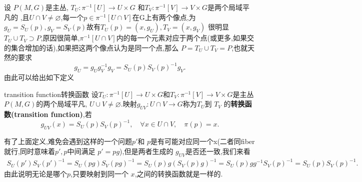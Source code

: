 \documentclass[../main.tex]{subfiles}
\begin{document}
 设 $P(M,G)$是主丛, $T_U : \pi^{-1} [U] \to  U \times G$ 和$T_V: \pi^{-1}[V] \to V \times G$是两个局域平凡的
 ,且$U \cap V \ne \varnothing$,每一个$p \in  \pi^{-1}[U\cap V]$在G上有两个像点,为
 $g_U = S_U(p), g_V = S_V(p)$故有$T_U(p) = (x,g_U),  T_V = (x,g_V)$
 很明显$T_U \cup T_V \supset P$,原因很简单,$\pi^{-1}[U \cap V]$内的每一个元素对应于两个点(或更多,如果交的集合增加的话),如果把这两个像点认为是同一个点,那么
 $P = T_U \cup T_V = P$,也就天然的要求\[
 g_U = g_U g_V^{-1}g_V = S_U(p)S_V(p)^{-1}g_V
 .\] 由此可以给出如下定义
 \begin{definition}
 {transition function}{转换函数}
 设$T_U : \pi^{-1}[U] \to U\times G$和$T_V : \pi^{-1} [V] \to V\times G$是主丛$P(M,G)$的两个局域平凡, $U \cup V \neq \varnothing $.映射$g_{UV} : U\cap V \to G$称为$T_U$到 $T_V$ 的\textbf{转换函数(transition function)},若
 \[
   g_{UV}(x) = S_U(p)S_V(p)^{-1},\quad \forall x \in U \cap V,\quad \pi(p) = x
 .\]
 \end{definition}
 有了上面定义,难免会遇到这样的一个问题$p'$和 $p$是有可能对应同一个x(二者同fiber就行,同时意味着$p',p$中间满足 $p' = pg$),但是两者生成的 $g_{UV}$是否还一致,我们来看
 \begin{align*}
 S_U(p')S_V(p')^{-1} = S_U(pg)S_V(pg)^{-1} = S_U(p)g(S_V(p)g)^{-1} = S_U(p)gg^{-1}S_V(p)^{-1} = S_U(p)S_V(p)^{-1}
 .\end{align*}
 由此说明无论是哪个$p$,只要映射到同一个 $x$,之间的转换函数就是一样的.
\end{document}
